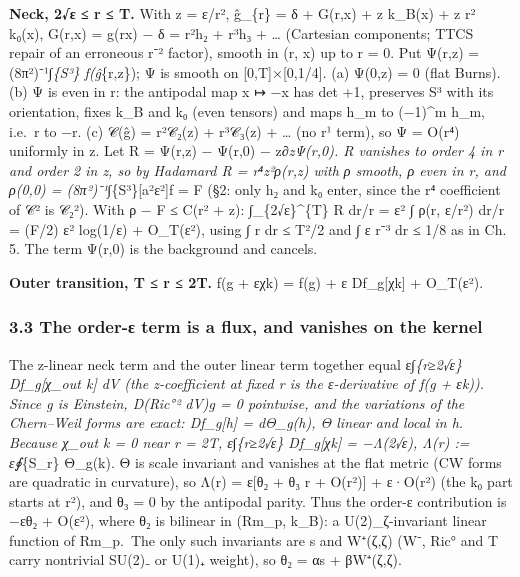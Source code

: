 \documentclass[
  10pt,
]{report}
\begin{document}
\textbf{Neck, 2√ε ≤ r ≤ T.} With z = ε/r², ĝ\_\{r\} = δ + G(r,x) + z
k\_B(x) + z r² k₀(x), G(r,x) = g(rx) − δ = r²h₂ + r³h₃ + \ldots{}
(Cartesian components; TTCS repair of an erroneous r⁻² factor), smooth
in (r, x) up to r = 0. Put Ψ(r,z) = (8π²)⁻¹∫\emph{\{S³\} f(ĝ}\{r,z\}); Ψ
is smooth on {[}0,T{]}×{[}0,1/4{]}. (a) Ψ(0,z) = 0 (flat Burns). (b) Ψ
is even in r: the antipodal map x ↦ −x has det +1, preserves S³ with its
orientation, fixes k\_B and k₀ (even tensors) and maps h\_m to (−1)\^{}m
h\_m, i.e.~r to −r. (c) 𝒞(ĝ) = r²𝒞₂(z) + r³𝒞₃(z) + \ldots{} (no r¹
term), so Ψ = O(r⁴) uniformly in z. Let R = Ψ(r,z) − Ψ(r,0) −
z∂\emph{zΨ(r,0). R vanishes to order 4 in r and order 2 in z, so by
Hadamard R = r⁴z²ρ(r,z) with ρ smooth, ρ even in r, and ρ(0,0) =
(8π²)⁻¹∫}\{S³\}{[}a²ε²{]}f = F (§2: only h₂ and k₀ enter, since the r⁴
coefficient of \textbar 𝒞\textbar² is \textbar 𝒞₂\textbar²). With
\textbar ρ − F\textbar{} ≤ C(r² + z): ∫\_\{2√ε\}\^{}\{T\} R dr/r = ε² ∫
ρ(r, ε/r²) dr/r = (F/2) ε² log(1/ε) + O\_T(ε²), using ∫ r dr ≤ T²/2 and
∫ ε r⁻³ dr ≤ 1/8 as in Ch. 5. The term Ψ(r,0) is the background and
cancels.

\textbf{Outer transition, T ≤ r ≤ 2T.} f(g + εχk) = f(g) + ε
Df\_g{[}χk{]} + O\_T(ε²).

\hypertarget{the-order-ux3b5-term-is-a-flux-and-vanishes-on-the-kernel}{%
\subsubsection{3.3 The order-ε term is a flux, and vanishes on the
kernel}\label{the-order-ux3b5-term-is-a-flux-and-vanishes-on-the-kernel}}

The z-linear neck term and the outer linear term together equal
ε∫\emph{\{r≥2√ε\} Df\_g{[}χ\_out k{]} dV (the z-coefficient at fixed r
is the ε-derivative of f(g + εk)). Since g is Einstein,
D(\textbar Ric°\textbar² dV)\emph{g = 0 pointwise, and the variations of
the Chern--Weil forms are exact: Df\_g{[}h{]} = dΘ\_g(h), Θ linear and
local in h. Because χ\_out k = 0 near r = 2T, ε∫}\{r≥2√ε\} Df\_g{[}χk{]}
= −Λ(2√ε), Λ(r) := ε∮}\{S\_r\} Θ\_g(k). Θ is scale invariant and
vanishes at the flat metric (CW forms are quadratic in curvature), so
Λ(r) = ε{[}θ₂ + θ₃ r + O(r²){]} + ε·O(r²) (the k₀ part starts at r²),
and θ₃ = 0 by the antipodal parity. Thus the order-ε contribution is
−εθ₂ + O(ε²), where θ₂ is bilinear in (Rm\_p, k\_B): a U(2)\_ζ-invariant
linear function of Rm\_p.~The only such invariants are s and W⁺(ζ,ζ)
(W⁻, Ric° and T carry nontrivial SU(2)₋ or U(1)₊ weight), so θ₂ = αs +
βW⁺(ζ,ζ).
\end{document}
